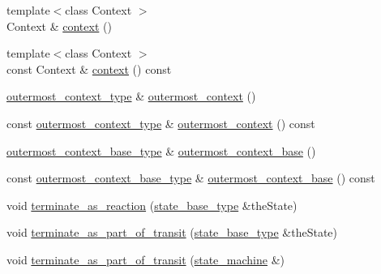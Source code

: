 \begin{DoxyCompactItemize}
\item 
{\footnotesize template$<$class Context $>$ }\\Context \& \mbox{\hyperlink{classboost_1_1statechart_1_1state__machine_a05dc556eca3931ddd2afb6bec54973ae}{context}} ()
\item 
{\footnotesize template$<$class Context $>$ }\\const Context \& \mbox{\hyperlink{classboost_1_1statechart_1_1state__machine_a0f5270e37c35f915c724b702044b8902}{context}} () const
\item 
\mbox{\hyperlink{classboost_1_1statechart_1_1state__machine_a3c047829e797a9501c7d69151d17e368}{outermost\+\_\+context\+\_\+type}} \& \mbox{\hyperlink{classboost_1_1statechart_1_1state__machine_a937f603c12a217efe19ce49f536b254d}{outermost\+\_\+context}} ()
\item 
const \mbox{\hyperlink{classboost_1_1statechart_1_1state__machine_a3c047829e797a9501c7d69151d17e368}{outermost\+\_\+context\+\_\+type}} \& \mbox{\hyperlink{classboost_1_1statechart_1_1state__machine_a882a09cb2b9013e63780ac7bf12b9e2a}{outermost\+\_\+context}} () const
\item 
\mbox{\hyperlink{classboost_1_1statechart_1_1state__machine_a05b007af532fafe2f186a18351beaa5e}{outermost\+\_\+context\+\_\+base\+\_\+type}} \& \mbox{\hyperlink{classboost_1_1statechart_1_1state__machine_a799d85b75a1d8f6eb4bc637427aab641}{outermost\+\_\+context\+\_\+base}} ()
\item 
const \mbox{\hyperlink{classboost_1_1statechart_1_1state__machine_a05b007af532fafe2f186a18351beaa5e}{outermost\+\_\+context\+\_\+base\+\_\+type}} \& \mbox{\hyperlink{classboost_1_1statechart_1_1state__machine_a29f6efc956b6277593d2cd4dcd963e12}{outermost\+\_\+context\+\_\+base}} () const
\item 
void \mbox{\hyperlink{classboost_1_1statechart_1_1state__machine_af1b30d30e04a470cc89c3e9e3792e993}{terminate\+\_\+as\+\_\+reaction}} (\mbox{\hyperlink{classboost_1_1statechart_1_1state__machine_a69cc258c29fcabec25c5dc8bedb7d530}{state\+\_\+base\+\_\+type}} \&the\+State)
\item 
void \mbox{\hyperlink{classboost_1_1statechart_1_1state__machine_ad67f22f0ca7a18cada1420b9d851530c}{terminate\+\_\+as\+\_\+part\+\_\+of\+\_\+transit}} (\mbox{\hyperlink{classboost_1_1statechart_1_1state__machine_a69cc258c29fcabec25c5dc8bedb7d530}{state\+\_\+base\+\_\+type}} \&the\+State)
\item 
void \mbox{\hyperlink{classboost_1_1statechart_1_1state__machine_a91a89a86d256b7ba4dd3ae50d7087c3f}{terminate\+\_\+as\+\_\+part\+\_\+of\+\_\+transit}} (\mbox{\hyperlink{classboost_1_1statechart_1_1state__machine}{state\+\_\+machine}} \&)

\end{DoxyCompactItemize}
